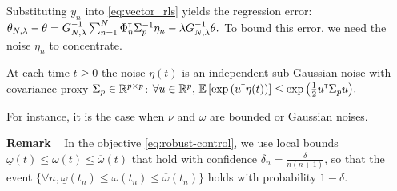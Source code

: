 \documentclass{article}
\begin{document}
Substituting $y_n$ into \eqref{eq:vector_rls} yields the regression error:
$
    \theta_{N,\lambda} - \theta = G_{N, \lambda}^{-1}\sum_{n=1}^N \Phi_n^{\mathsf{\scriptscriptstyle T}} \Sigma_p^{-1}\eta_n - \lambda G_{N, \lambda}^{-1}\theta.
$
To bound this error, we need the noise $\eta_n$ to concentrate.
%
%
%
%
%

\begin{assumption}
\label{assumpt:gaussian-noise}
At each time $t\geq0$ the noise $\eta(t)$ is an independent sub-Gaussian noise with covariance proxy $\Sigma_p \in \mathbb{R}^{p\times p}$:
$
    \forall u\in\mathbb{R}^p,\, \operatorname*{\mathbb{E}} \left[ \exp{\left( u^{\mathsf{\scriptscriptstyle T}}\eta(t)\right)}\right] \leq \exp{\left( \frac{1}{2} u^{\mathsf{\scriptscriptstyle T}}\Sigma_p u\right)}.
$
\end{assumption}
For instance, it is the case when $\nu$ and $\omega$ are bounded or Gaussian noises.

\textbf{Remark} ~ In the objective \eqref{eq:robust-control}, we use local bounds  $\underline{\omega}(t)\leq \omega(t) \leq \overline{\omega}(t)$ that hold with confidence $\delta_n = \frac{\delta}{n(n+1)}$, so that the event $\{\forall n, \underline{\omega}(t_n) \leq \omega(t_n) \leq \overline{\omega}(t_n)\}$ holds with probability $1-\delta$.
\end{document}
